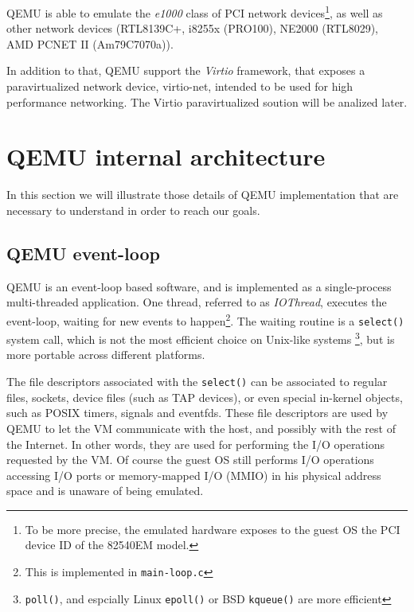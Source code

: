 QEMU is able to emulate the \emph{e1000} class of PCI network devices\footnote{To be more precise, the emulated hardware exposes
to the guest OS the PCI device ID of the 82540EM model.}, as well as other network devices (RTL8139C+, i8255x (PRO100), 
NE2000 (RTL8029), AMD PCNET II (Am79C7070a)).

In addition to that, QEMU support the \emph{Virtio} framework, that exposes a paravirtualized network device, virtio-net, intended 
to be used for high performance networking. The Virtio paravirtualized soution will be analized later.



\section{QEMU internal architecture}
In this section we will illustrate those details of QEMU implementation that are necessary to understand in order to reach our
goals.

\subsection{QEMU event-loop}
\label{sec:qemuel}
QEMU is an event-loop based software, and is implemented as a single-process multi-threaded application. 
One thread, referred to as \emph{IOThread}, executes the event-loop, waiting for new events to happen\footnote{This is 
implemented in \texttt{main-loop.c}}.
The waiting routine is a \texttt{select()} system call, which is not the most efficient choice on Unix-like systems
\footnote{ \texttt{poll()}, and espcially Linux \texttt{epoll()} or BSD \texttt{kqueue()} are more efficient},
but is more portable across different platforms.

\vspace{0.5cm}

The file descriptors associated with the \texttt{select()} can be associated to regular files, sockets, device files (such as TAP 
devices), or even special in-kernel objects, such as POSIX timers, signals and eventfds. These file descriptors are used by QEMU to let
the VM communicate with the host, and possibly with the rest of the Internet. In other words, they are used for performing the I/O 
operations requested by the VM. Of course the guest OS still performs I/O operations accessing I/O ports or memory-mapped I/O (MMIO) in 
his physical address space and is unaware of being emulated.

\vspace{0.5cm}

